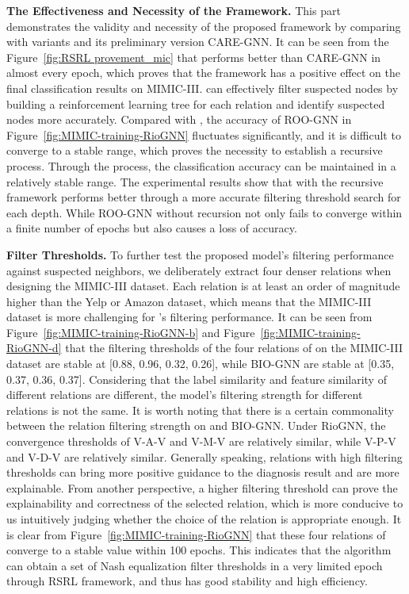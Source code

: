 \textbf{The Effectiveness and Necessity of the \RSRL Framework.}
This part demonstrates the validity and necessity of the proposed framework by comparing \RioGNN with variants and its preliminary version CARE-GNN.
It can be seen from the Figure~\ref{fig:RSRL provement_mic} that \RioGNN performs better than CARE-GNN in almost every epoch, which proves that the \RSRL framework has a positive effect on the final classification results on MIMIC-III.
\RioGNN can effectively filter suspected nodes by building a reinforcement learning tree for each relation and identify suspected nodes more accurately. 
Compared with \RioGNN, the accuracy of ROO-GNN in Figure~\ref{fig:MIMIC-training-RioGNN} fluctuates significantly, and it is difficult to converge to a stable range, which proves the necessity to establish a recursive process.
Through the \RSRL process, the classification accuracy can be maintained in a relatively stable range. 
The experimental results show that \RioGNN with the recursive framework performs better through a more accurate filtering threshold search for each depth.
While ROO-GNN without recursion not only fails to converge within a finite number of epochs but also causes a loss of accuracy.



\textbf{Filter Thresholds. }
To further test the proposed model's filtering performance against suspected neighbors, we deliberately extract four denser relations when designing the MIMIC-III dataset.
Each relation is at least an order of magnitude higher than the Yelp or Amazon dataset, which means that the MIMIC-III dataset is more challenging for \RioGNN's filtering performance.
It can be seen from Figure~\ref{fig:MIMIC-training-RioGNN-b} and Figure~\ref{fig:MIMIC-training-RioGNN-d} that the filtering thresholds of the four relations of \RioGNN on the MIMIC-III dataset are stable at [0.88, 0.96, 0.32, 0.26], while BIO-GNN are stable at [0.35, 0.37, 0.36, 0.37].
Considering that the label similarity and feature similarity of different relations are different, the model's filtering strength for different relations is not the same. 
It is worth noting that there is a certain commonality between the relation filtering strength on \RioGNN and BIO-GNN.
Under RioGNN, the convergence thresholds of V-A-V and V-M-V are relatively similar, while V-P-V and V-D-V are relatively similar. 
Generally speaking, relations with high filtering thresholds can bring more positive guidance to the diagnosis result and are more explainable. 
From another perspective, a higher filtering threshold can prove the explainability and correctness of the selected relation, which is more conducive to us intuitively judging whether the choice of the relation is appropriate enough. 
It is clear from Figure~\ref{fig:MIMIC-training-RioGNN} that these four relations of \RioGNN converge to a stable value within 100 epochs.
This indicates that the algorithm can obtain a set of Nash equalization filter thresholds in a very limited epoch through RSRL framework, and thus has good stability and high efficiency. 






